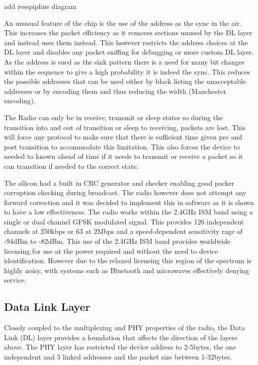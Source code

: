 {add resspipline diagram}


An unusual feature of the chip is the use of the address as the sync in the air. This increases the
packet efficiency as it removes sections unused by the DL layer and instead uses them instead. This
however restricts the address choices at the DL layer and disables any packet sniffing for debugging
or more custom DL layer. As the address is sued as the sink pattern there is a need for many bit
changes within the sequence to give a high probability it is indeed the sync. This reduces the possible
addresses that can be used either by black listing the unacceptable addresses or by encoding them
and thus reducing the width (\eg Manchester encoding).


The Radio can only be in receive, transmit or sleep states so during the transition into and out of
transition or sleep to receiving, packets are lost. This will force any protocol to make sure that there
is sufficient time given pre and post transition to accommodate this limitation. This also forces the
device to needed to known ahead of time if it needs to transmit or receive a packet so it can
transition if needed to the correct state.


The silicon had a built in CRC generator and checker enabling good packer corruption checking
during broadcast. The radio however does not attempt any forward correction and it was decided to
implement this in software as it is shown to have a low effectiveness\cite{NetworkDesign1998}.
The radio works within the 2.4GHz ISM band using a single or dual channel GFSK modulated signal.
This provides 126 independent channels at 250kbps or 63 at 2Mbps and a speed-dependent
sensitivity rage of -94dBm to -82dBm. This use of the 2.4GHz ISM band provides worldwide licensing
for use at the power required and without the need to device identification. However due to the
relaxed licensing this region of the spectrum is highly noisy, with systems such as Bluetooth and
microwaves effectively denying service.

\subsection{Data Link Layer}
Closely coupled to the multiplexing and PHY properties of the radio, the Data Link (DL) layer provides
a foundation that affects the direction of the layers above. The PHY layer has restricted the device
address to 2-5bytes, the one independent and 5 linked addresses and the packet size between 1-32bytes.


